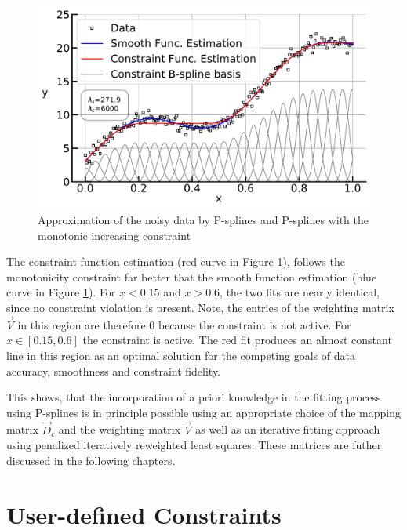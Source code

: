 \documentclass[10pt,a4paper]{report}
\begin{document}
\begin{figure}[H]
	\centering
	\includegraphics[width=\linewidth]{../thesisplots/inc_spline.pdf}
	\caption{Approximation of the noisy data by P-splines and P-splines with the monotonic increasing constraint}
	\label{fig:incspline}
\end{figure}	

The constraint function estimation (red curve in Figure \ref{fig:incspline}), follows the monotonicity constraint far better that the smooth function estimation (blue curve in Figure \ref{fig:incspline}). For $x < 0.15$ and $x > 0.6$, the two fits are nearly identical, since no constraint violation is present. Note, the entries of the weighting matrix $\vec{V}$ in this region are therefore $0$ because the constraint is not active. For $x \in [0.15, 0.6]$ the constraint is active. The red fit produces an almost constant line in this region as an optimal solution for the competing goals of data accuracy, smoothness and constraint fidelity.

This shows, that the incorporation of a priori knowledge in the fitting process using P-splines is in principle possible using an appropriate choice of the mapping matrix $\vec{D}_c$ and the weighting matrix $\vec{V}$ as well as an iterative fitting approach using penalized iteratively reweighted least squares. These matrices are futher discussed in the following chapters.

\section{User-defined Constraints} \label{sec:user-defined-constraints}
\end{document}
